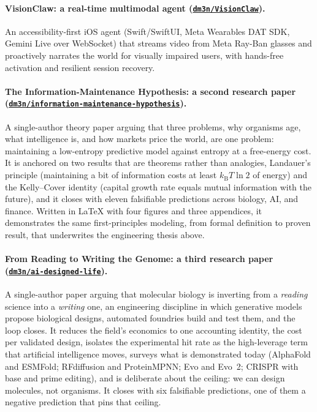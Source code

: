 \documentclass[11pt]{article}
\theoremstyle{plain}
\theoremstyle{definition}
\newcommand{\repo}[1]{\href{https://github.com/dm3n/#1}{\nolinkurl{dm3n/#1}}}
\begin{document}
\paragraph{VisionClaw: a real-time multimodal agent
(\repo{VisionClaw}).} An accessibility-first iOS agent (Swift/SwiftUI, Meta Wearables DAT
SDK, Gemini Live over WebSocket) that streams video from Meta Ray-Ban glasses and
proactively narrates the world for visually impaired users, with hands-free activation and
resilient session recovery.

\paragraph{The Information-Maintenance Hypothesis: a second research paper
(\repo{information-maintenance-hypothesis}).} A single-author theory paper arguing that
three problems, why organisms age, what intelligence is, and how markets price the world,
are one problem: maintaining a low-entropy predictive model against entropy at a
free-energy cost. It is anchored on two results that are theorems rather than analogies,
Landauer's principle (maintaining a bit of information costs at least $k_{\mathrm B}T\ln 2$
of energy) and the Kelly--Cover identity (capital growth rate equals mutual information with
the future), and it closes with eleven falsifiable predictions across biology, AI, and
finance. Written in \LaTeX{} with four figures and three appendices, it demonstrates the
same first-principles modeling, from formal definition to proven result, that underwrites
the engineering thesis above.

\paragraph{From Reading to Writing the Genome: a third research paper
(\repo{ai-designed-life}).} A single-author paper arguing that molecular biology is
inverting from a \emph{reading} science into a \emph{writing} one, an engineering
discipline in which generative models propose biological designs, automated foundries
build and test them, and the loop closes. It reduces the field's economics to one
accounting identity, the cost per validated design, isolates the experimental hit rate as
the high-leverage term that artificial intelligence moves, surveys what is demonstrated
today (AlphaFold and ESMFold; RFdiffusion and ProteinMPNN; Evo and Evo~2; CRISPR with base
and prime editing), and is deliberate about the ceiling: we can design molecules, not
organisms. It closes with six falsifiable predictions, one of them a negative prediction
that pins that ceiling.
\end{document}

